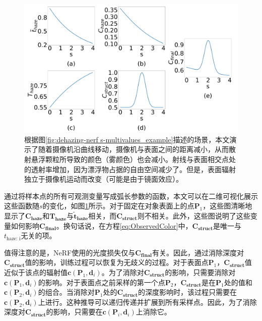 \begin{figure}[ht]
    \centering
    \includegraphics[width=\textwidth]{undergraduate-thesis/images/dehazing-nerf/s-multivalues_relation.pdf}
    \caption{根据图\ref{fig:dehazing-nerf s-multivalues_example}描述的场景，本文演示了随着摄像机沿曲线移动，摄像机与表面之间的距离减小，从而散射悬浮颗粒所导致的颜色（雾颜色）也会减小。射线与表面相交点处的透射率增加，因为漂浮物占据的自由空间减少了。但是，表面辐射独立于摄像机运动而改变（可能是由于镜面效应）。}
    \label{fig:dehazing-nerf view-dependency_relation}
\end{figure}

通过将样本点的所有可观测变量写成弧长参数的函数，本文可以在二维可视化展示这些函数随$s$的变化，如图\ref{fig:dehazing-nerf view-dependency_relation}所示。对于固定在对象表面上的点$\mathbf{P}_1$，这些图清晰地显示了$\mathbf{C_\text{haze}}$和$\mathbf{T_\text{haze}}$与$\mathbf{\tilde{t}_\text{haze}}$相关，而$\mathbf{C_\text{struct}}$则不相关。此外，这些图说明了这些变量如何影响$\mathbf{C_\text{final}}$。换句话说，在方程\ref{eq:ObservedColor}中，$\mathbf{C_\text{struct}}$是唯一与${t}_\text{haze: i}$无关的项。

值得注意的是，NeRF使用的光度损失仅与$\mathbf{C_\text{final}}$有关。因此，通过消除深度对$\mathbf{C_\text{struct}}$值的影响，训练过程可以恢复为无歧义的过程。对于表面点$\mathbf{P}_1$，$\mathbf{C_\text{struct}}$值近似于该点的辐射值$\mathbf{c}(\mathbf{P}_1, \mathbf{d}_i)$。为了消除对$\mathbf{C_\text{struct}}$的影响，只需要消除对$\mathbf{c}(\mathbf{P}_1, \mathbf{d}_i)$的影响。对于表面点之前采样的第一个点$\mathbf{P}_2$，$\mathbf{C_\text{struct}}$是在$\mathbf{P}_1$处的值和$\mathbf{c}(\mathbf{P}_2, \mathbf{d}_i)$的组合。当消除对$\mathbf{P}_1$处的$\mathbf{C_\text{struct}}$的深度影响时，该过程只需要在$\mathbf{c}(\mathbf{P}_2, \mathbf{d}_i)$上进行。这种推导可以递归传递并扩展到所有采样点。因此，为了消除深度对$\mathbf{C_\text{struct}}$的影响，只需要在$\mathbf{c}(\mathbf{P}_i, \mathbf{d}_i)$上消除它。

